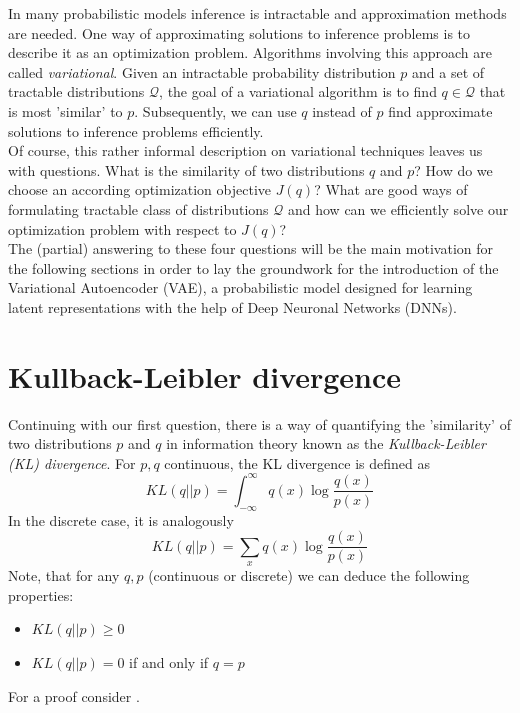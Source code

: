\documentclass[12pt]{report}
\begin{document}
In many probabilistic models inference is intractable and approximation methods are needed. One way of approximating solutions to inference problems is to describe it as an optimization problem. Algorithms involving this approach are called \emph{variational}.
Given an intractable probability distribution $p$ and a set of tractable distributions $\mathcal{Q}$, the goal of a variational algorithm is to find $q \in \mathcal{Q}$ that is most 'similar' to $p$. Subsequently, we can use $q$ instead of $p$ find approximate solutions to inference problems efficiently.\\
Of course, this rather informal description on variational techniques leaves us with questions. What is the similarity of two distributions $q$ and $p$? How do we choose an according optimization objective $J(q)$? What are good ways of formulating tractable class of distributions $\mathcal{Q}$ and how can we efficiently solve our optimization problem with respect to $J(q)$? \\
The (partial) answering to these four questions will be the main motivation for the following sections in order to lay the groundwork for the introduction of the Variational Autoencoder (VAE), a probabilistic model designed for learning latent representations with the help of Deep Neuronal Networks (DNNs).

\section{Kullback-Leibler divergence}
Continuing with our first question, there is a way of quantifying the 'similarity' of two distributions $p$ and $q$ in information theory known as the \emph{Kullback-Leibler (KL) divergence}. For $p, q$ continuous, the KL divergence is defined as %
\begin{equation}
	KL(q||p) = \int_{-\infty}^{\infty} q(x) \log \frac{q(x)}{p(x)}
\end{equation}
In the discrete case, it is analogously 
\begin{equation}
	KL(q||p) = \sum_{x} q(x) \log \frac{q(x)}{p(x)}
\end{equation}
Note, that for any $q, p$ (continuous or discrete) we can deduce the following properties:
\begin{itemize}
	\item $KL(q||p) \geq 0$
	\item $KL(q||p) = 0$ if and only if $q = p$
\end{itemize}
For a proof consider .\\ %
\end{document}
